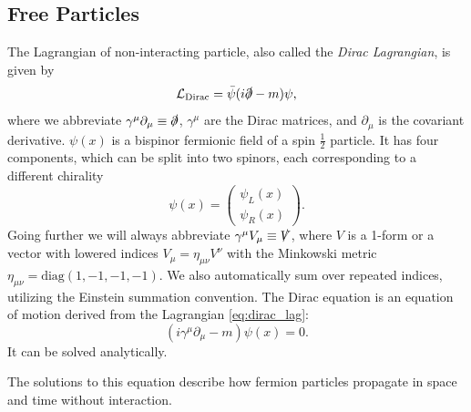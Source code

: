 \subsection{Free Particles}
\label{sec:free_particles}
The Lagrangian of non-interacting \spinhalf particle, also called the \emph{Dirac Lagrangian}, is given by
\begin{equation}
    \label{eq:dirac_lag}
    \mathcal{L}_{\text{Dirac}} = \bar{\psi}(i\slashed{\partial} - m) \psi,
\end{equation}
where we abbreviate $\gamma^\mu \partial_\mu \equiv \slashed{\partial}$, $\gamma^\mu$ are the Dirac matrices, and $\partial_\mu$ is the covariant derivative.
$\psi(x)$ is a bispinor fermionic field of a spin $\frac{1}{2}$ particle. 
It has four components, which can be split into two spinors, each corresponding to a different chirality
\begin{equation}
    \psi(x) = \left( \begin{array}{c} \psi_L(x) \\ \psi_R(x) \end{array} \right).
\end{equation}
Going further we will always abbreviate $\gamma^\mu V_\mu \equiv \slashed{V}$, where $V$ is a 1-form or a vector with lowered indices $V_\mu = \eta_{\mu \nu} V^\nu$ with the Minkowski metric $\eta_{\mu \nu} = \text{diag}(1,-1,-1,-1)$. 
We also automatically sum over repeated indices, utilizing the Einstein summation convention.
The Dirac equation is an equation of motion derived from the Lagrangian \cref{eq:dirac_lag}:
\begin{equation}
    \label{eq:dirac}
    \left( i \gamma^\mu \partial_\mu - m \right) \psi(x) = 0.
\end{equation}
It can be solved analytically.

The solutions to this equation describe how fermion particles propagate in space and time without interaction. 

